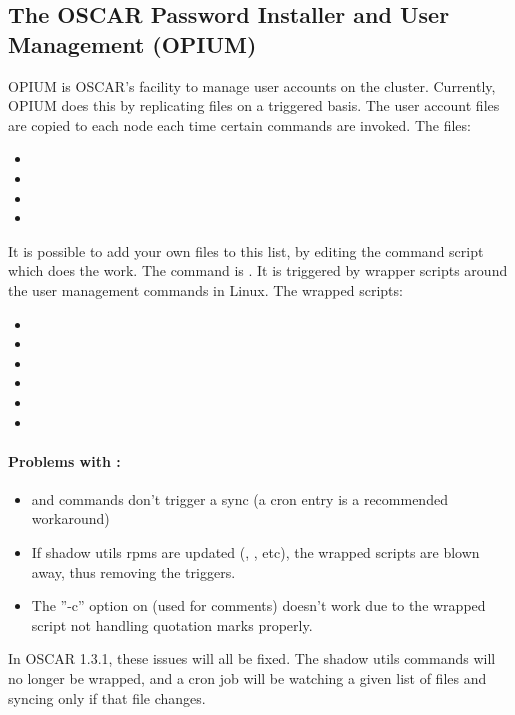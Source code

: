 %
%
%

\subsection{The OSCAR Password Installer and User Management (OPIUM)}
\label{app:opium-overview}

OPIUM is OSCAR's facility to manage user accounts on the cluster.  Currently,
OPIUM does this by replicating files on a triggered basis.  The user account
files are copied to each node each time certain commands are invoked.
The files:
\begin{itemize}
\item {}
\item {}
\item {}
\item {}
\end{itemize}
It is possible to add your own files to this list, by editing the command
script which does the work.
The command is .  It is triggered by wrapper
scripts around the user management commands in Linux.  The wrapped scripts:
\begin{itemize}
\item {}
\item {}
\item {}
\item {}
\item {}
\item {}
\end{itemize}

\paragraph{Problems with :}
\begin{itemize}
\item {} and  commands don't trigger a sync
(a cron entry is a recommended workaround)
\item If shadow utils rpms are updated
(, , etc), the wrapped
scripts are blown away, thus removing the  triggers.
\item The ''-c'' option on (used for comments) doesn't work due to
the wrapped script not handling quotation marks properly.
\end{itemize}
In OSCAR 1.3.1, these issues will all be fixed.  The shadow utils commands
will no longer be wrapped, and a cron job will be watching a given list of
files and syncing only if that file changes.

